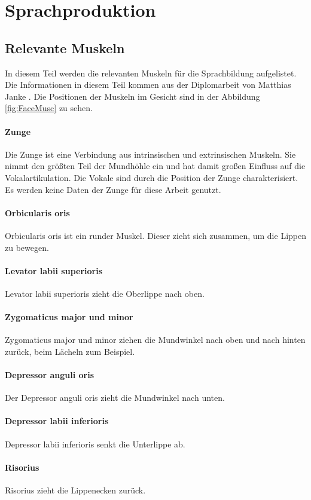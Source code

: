 \section{Sprachproduktion}

\subsection{Relevante Muskeln}
In diesem Teil werden die relevanten Muskeln für die Sprachbildung aufgelistet. Die Informationen in diesem Teil kommen aus der Diplomarbeit von Matthias Janke \cite{janke2016emg}. Die Positionen der Muskeln im Gesicht sind in der Abbildung \ref{fig:FaceMusc} zu sehen.

\paragraph{Zunge}
Die Zunge  ist eine Verbindung aus intrinsischen und extrinsischen Muskeln. Sie nimmt den größten Teil der Mundhöhle ein und hat damit großen Einfluss
auf die Vokalartikulation. Die Vokale sind durch die Position der Zunge charakterisiert. Es werden keine Daten der Zunge für diese Arbeit genutzt.

\paragraph{Orbicularis oris} 
Orbicularis oris ist ein runder Muskel. Dieser zieht sich zusammen, um die Lippen zu bewegen.
\paragraph{Levator labii superioris}
Levator labii superioris zieht die Oberlippe nach oben.
\paragraph{Zygomaticus major und minor}
Zygomaticus major und minor ziehen die Mundwinkel nach oben und nach hinten zurück, beim Lächeln zum Beispiel.
\paragraph{Depressor anguli oris}
Der Depressor anguli oris zieht die Mundwinkel nach unten.
\paragraph{Depressor labii inferioris}
Depressor labii inferioris senkt die Unterlippe ab.
\paragraph{Risorius}
Risorius zieht die Lippenecken zurück.
